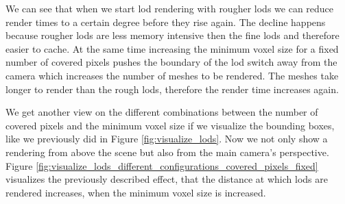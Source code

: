 We can see that when we start \ac{lod} rendering with rougher \acsp{lod} we can reduce render times to a certain degree before they rise again.
The decline happens because rougher \acsp{lod} are less memory intensive then the fine \acsp{lod} and therefore easier to cache.
At the same time increasing the minimum voxel size for a fixed number of covered pixels pushes the boundary of the \ac{lod} switch away from the camera which increases the number of meshes to be rendered.
The meshes take longer to render than the rough \acsp{lod}, therefore the render time increases again.

We get another view on the different combinations between the number of covered pixels and the minimum voxel size if we visualize the bounding boxes, like we previously did in Figure \ref{fig:visualize_lods}.
Now we not only show a rendering from above the scene but also from the main camera's perspective.
Figure \ref{fig:visualize_lods_different_configurations_covered_pixels_fixed} visualizes the previously described effect, that the distance at which \acsp{lod} are rendered increases, when the minimum voxel size is increased.
